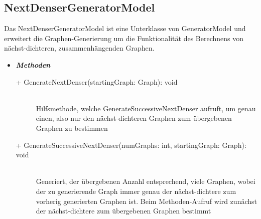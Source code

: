 \documentclass[13pt]{scrreprt}
\begin{document}
	\subsection{NextDenserGeneratorModel}
	Das NextDenserGeneratorModel ist eine Unterklasse von GeneratorModel und erweitert die Graphen-Generierung um die Funktionalität des Berechnens von nächst-dichteren, zusammenhängenden Graphen.
	\begin{itemize}[label = {$\circ$}]
		\item {\large \textbf{\textit{Methoden}}\par}
		\begin{description}
			\item [+ GenerateNextDenser(startingGraph: Graph): void] \hfill \\ Hilfsmethode, welche GenerateSuccessiveNextDenser aufruft, um genau einen, also nur den nächst-dichteren Graphen zum übergebenen Graphen zu bestimmen
			\item [+ GenerateSuccessiveNextDenser(numGraphs: int, startingGraph: Graph): void] \hfill \\ Generiert, der übergebenen Anzahl entsprechend, viele Graphen, wobei der zu generierende Graph immer genau der nächst-dichtere zum vorherig generierten Graphen ist. Beim Methoden-Aufruf wird zunächst der nächst-dichtere zum übergebenen Graphen bestimmt
		\end{description}
	\end{itemize}	
	
\end{document}
